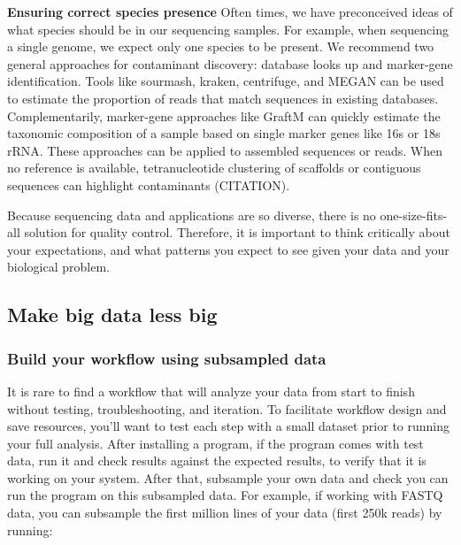 \documentclass[10pt,letterpaper]{article}
\begin{document}
\textbf{Ensuring correct species presence }
Often times, we have preconceived ideas of what species should be in our sequencing samples. 
For example, when sequencing a single genome, we expect only one species to be present. 
We recommend two general approaches for contaminant discovery: database looks up and marker-gene identification. 
Tools like sourmash, kraken, centrifuge, and MEGAN can be used to estimate the proportion of reads that match sequences in existing databases. 
Complementarily, marker-gene approaches like GraftM can quickly estimate the taxonomic composition of a sample based on single marker genes like 16s or 18s rRNA. 
These approaches can be applied to assembled sequences or reads. 
When no reference is available, tetranucleotide clustering of scaffolds or contiguous sequences can highlight contaminants (CITATION).%

Because sequencing data and applications are so diverse, there is no one-size-fits-all solution for quality control. 
Therefore, it is important to think critically about your expectations, and what patterns you expect to see given your data and your biological problem. 

\subsection*{Make big data less big} %

\subsubsection*{Build your workflow using subsampled data}

It is rare to find a workflow that will analyze your data from start to finish without testing, troubleshooting, and iteration.
To facilitate workflow design and save resources, you'll want to test each step with a small dataset prior to running your full analysis. 
After installing a program, if the program comes with test data, run it and check results against the expected results, to verify that it is working on your system. 
After that, subsample your own data and check you can run the program on this subsampled data. 
For example, if working with FASTQ data, you can subsample the first million lines of your data (first 250k reads) by running:
\end{document}
